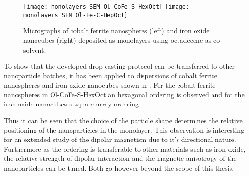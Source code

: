 \documentclass[\main/dresen_thesis.tex]{subfiles}
\begin{document}
  \label{sec:monolayers:preparation:nanoparticleVariation}
    \begin{figure}[tb]
      \centering
      \texttt{[image: monolayers\_SEM\_Ol-CoFe-S-HexOct]}
      \texttt{[image: monolayers\_SEM\_Ol-Fe-C-HepOct]}
      \caption{\label{fig:monolayers:preparation:nanoparticleVariation:spheresIron}Micrographs of cobalt ferrite nanospheres (left) and iron oxide nanocubes (right) deposited as monolayers using octadecene as co-solvent.}
    \end{figure}

    To show that the developed drop casting protocol can be transferred to other nanoparticle batches, it has been applied to dispersions of cobalt ferrite nanospheres and iron oxide nanocubes shown in .
    For the cobalt ferrite nanospheres in Ol-CoFe-S-HexOct an hexagonal ordering is observed and for the iron oxide nanocubes a square array ordering.

    Thus it can be seen that the choice of the particle shape determines the relative positioning of the nanoparticles in the monolayer.
    This observation is interesting for an extended study of the dipolar magnetism due to it's directional nature.
    Furthermore as the ordering is transferable to other materials such as iron oxide, the relative strength of dipolar interaction and the magnetic anisotropy of the nanoparticles can be tuned.
    Both go however beyond the scope of this thesis.
\end{document}
